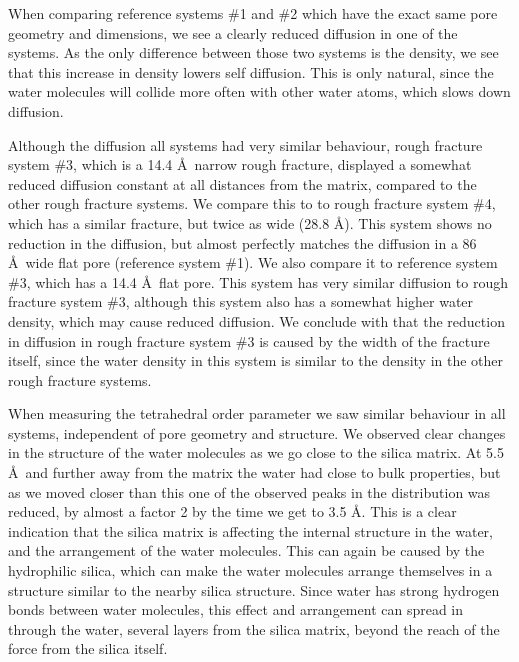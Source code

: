 When comparing reference systems \#1 and \#2 which have the exact same pore geometry and dimensions, we see a clearly reduced diffusion in one of the systems. As the only difference between those two systems is the density, we see that this increase in density lowers self diffusion. This is only natural, since the water molecules will collide more often with other water atoms, which slows down diffusion.

Although the diffusion all systems had very similar behaviour, rough fracture system \#3, which is a 14.4 \AA\ narrow rough fracture, displayed a somewhat reduced diffusion constant at all distances from the matrix, compared to the other rough fracture systems. We compare this to to rough fracture system \#4, which has a similar fracture, but twice as wide (28.8 \AA). This system shows no reduction in the diffusion, but almost perfectly matches the diffusion in a 86 \AA\ wide flat pore (reference system \#1). We also compare it to reference system \#3, which has a 14.4 \AA\ flat pore. This system has very similar diffusion to rough fracture system \#3, although this system also has a somewhat higher water density, which may cause reduced diffusion. We conclude with that the reduction in diffusion in rough fracture system \#3 is caused by the width of the fracture itself, since the water density in this system is similar to the density in the other rough fracture systems. 


When measuring the tetrahedral order parameter we saw similar behaviour in all systems, independent of pore geometry and structure. We observed clear changes in the structure of the water molecules as we go close to the silica matrix. At 5.5 \AA\ and further away from the matrix the water had close to bulk properties, but as we moved closer than this one of the observed peaks in the distribution was reduced, by almost a factor 2 by the time we get to 3.5 \AA. This is a clear indication that the silica matrix is affecting the internal structure in the water, and the arrangement of the water molecules. This can again be caused by the hydrophilic silica, which can make the water molecules arrange themselves in a structure similar to the nearby silica structure. Since water has strong hydrogen bonds between water molecules, this effect and arrangement can spread in through the water, several layers from the silica matrix, beyond the reach of the force from the silica itself.


